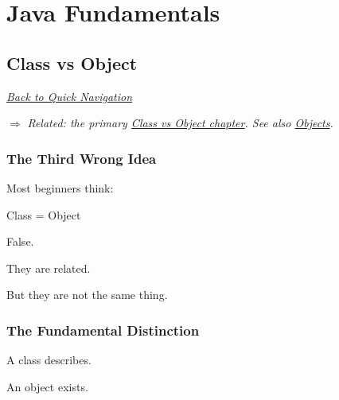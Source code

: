 \documentclass[11pt,a4paper]{book}
\begin{document}

\part{Java Fundamentals}
\chapter{Class vs Object}

\smallskip
\noindent
\hyperref[sec:quick_nav]{\emph{Back to Quick Navigation}}

\smallskip
\noindent
\textcolor{RosettaRoyalPurple}{$\Rightarrow$}
\emph{Related: the primary \hyperref[chap:class_vs_object]{Class vs Object chapter}. See also \hyperref[chap:objects_identity]{Objects}.}


\section{The Third Wrong Idea}

\begin{trap}

Most beginners think:

\begin{center}
Class = Object
\end{center}

False.

They are related.

But they are not the same thing.

\end{trap}


\section{The Fundamental Distinction}

\begin{idea}

A class describes.

An object exists.

\end{idea}
\end{document}
